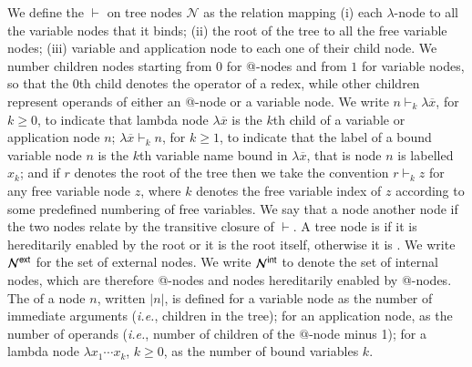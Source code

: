 \documentclass{elsarticle}
\makeatletter
\theoremstyle{plain}
\theoremstyle{definition}
\newcommand\Nodes{\mathcal{N}}%
\newcommand{\enables}{\vdash} %
\newcommand{\ExternalNodes}{\Nodes^{\sf ext}}
\newcommand{\InternalNodes}{\Nodes^{\sf int}}
\renewcommand\ie{{\it i.e.\@\xspace}}
\makeatother
\begin{document}
We define the  $\enables$ on tree nodes $\Nodes$ as the relation mapping (i) each $\lambda$-node to all the variable nodes that it binds; (ii) the root of the tree to all the free variable nodes; (iii) variable and application node to each one of their child node.
We number children nodes starting from $0$ for @-nodes and from $1$ for variable nodes, so that the $0$th child denotes the operator of a redex, while other children represent operands of either an @-node or a variable node.
%
We write
$n \enables_k \lambda\overline{x}$, for $k\geq0$, to indicate that
lambda node $\lambda\overline{x}$ is the $k$th child of a variable or application node $n$;
$\lambda\overline{x} \enables_k n$, for $k\geq1$, to indicate that the label of a bound variable node $n$ is the $k$th variable name bound in $\lambda\overline{x}$, that is node $n$ is labelled $x_k$;
 and if $r$ denotes the root of the tree then we take the convention $r \enables_k z$ for any free variable node $z$, where $k$ denotes the free variable index of $z$ according to some predefined numbering of free variables.
%
We say that a node  another node if the two nodes relate by the transitive closure of $\enables$.
%
A tree node is  if it is hereditarily enabled by the root or it is the root itself, otherwise it is . We write $\ExternalNodes$ for the set of external nodes.
We write $\InternalNodes$ to denote the set of internal nodes, which are therefore @-nodes and nodes hereditarily enabled by @-nodes.
The  of a node $n$, written $|n|$,
is defined for a variable node as the number of immediate arguments (\ie, children in the tree); for an application node, as the number of operands (\ie, number of children of the $@$-node minus 1); for a lambda node $\lambda x_1 \cdots x_k$, $k\geq 0$, as the number of bound variables $k$.
\end{document}
